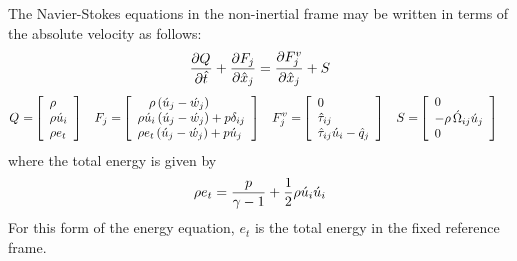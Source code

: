 The Navier-Stokes equations in the non-inertial frame may be written
in terms of the absolute velocity as follows:
%
\begin{gather}
  \frac{\partial \cvVar}{\partial \rot{t}}
+ \frac{\partial F_j   }{\partial \rot{x}_j}
= \frac{\partial F_j^v }{\partial \rot{x}_j}
+ S
\end{gather}
\begin{align}
  \cvVar =& \left[
              \begin{array}{l}
                \obj{\rho} \\
                \obj{\rho} \mvi{u}{i} \\
                \obj{\rho} \fix{e}_t
              \end{array}
           \right] &
  F_j    =& \left[
              \begin{array}{l}
                \phantom{\mvi{u}{i}} %
                \obj{\rho}           \left( \mvi{u}{j}
              - \mvi{\FrameVelVar}{j} \right)
              \\
                \obj{\rho} \mvi{u}{i}\left( \mvi{u}{j}
              - \mvi{\FrameVelVar}{j} \right) + \obj{p} \delta_{ij}
              \\
                \obj{\rho} \fix{e}_t \left( \mvi{u}{j}
              - \mvi{\FrameVelVar}{j} \right) + \obj{p} \mvi{u}{j}
              \end{array}
            \right] &
  F_j^v  =& \left[
              \begin{array}{l}
                0 \\
                \rti{\stressvar}{ij} \\
                \rti{\stressvar}{ij} \mvi{u}{i} - \rvi{\heatfluxvar}{j}
              \end{array}
            \right] &
  S      =& \left[
              \begin{array}{l}
                0 \\
                - \obj{\rho} \, \mti{\FrameSpinTenVar}{ij} \mvi{u}{j} \\
                0
              \end{array}
            \right]
\end{align}
%
where the total energy is given by
\begin{gather}
  {{\rho}} e_t = \frac{{{p}}}{\gamma-1}
                 + \frac{1}{2} {{\rho}} {{{{\acute{u}}}}}_{i} {{{{\acute{u}}}}}_{i}
\end{gather}
For this form of the energy equation, $e_t$ is the total energy in the
fixed reference frame.
 
